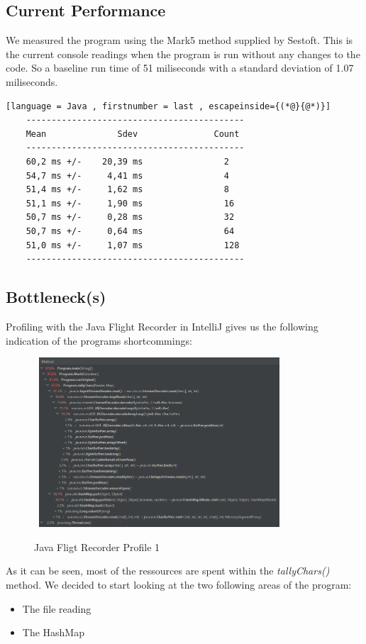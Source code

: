 \vspace{0.5cm}
\subsection{Current Performance}
\label{sec:2.2}
We measured the program using the Mark5 method supplied by Sestoft.\cite{sestoft} \newline
This is the current console readings when the program is run without any changes to the code. 
So a baseline run time of 51 miliseconds with a standard deviation of 1.07 miliseconds. 
\begin{lstlisting}[language = Java , firstnumber = last , escapeinside={(*@}{@*)}]
    -------------------------------------------
    Mean              Sdev               Count
    -------------------------------------------
    60,2 ms +/-    20,39 ms                2
    54,7 ms +/-     4,41 ms                4
    51,4 ms +/-     1,62 ms                8
    51,1 ms +/-     1,90 ms                16
    50,7 ms +/-     0,28 ms                32
    50,7 ms +/-     0,64 ms                64
    51,0 ms +/-     1,07 ms                128
    -------------------------------------------
\end{lstlisting}

\newpage
\subsection{Bottleneck(s)}
\label{sec:2.3}
Profiling with the Java Flight Recorder in IntelliJ gives us the following indication of the programs shortcommings:
\begin{figure}[H]
    \centering\
    \includegraphics[width = 0.8\textwidth ]{figures/profile1.PNG}
    \caption{Java Fligt Recorder Profile 1}
    \label{fig:p1}
\end{figure}
As it can be seen, most of the ressources are spent within the \emph{tallyChars()} method. We decided to start looking at the two following areas of the program:
\begin{itemize}
    \item The file reading
    \item The HashMap 
\end{itemize}

